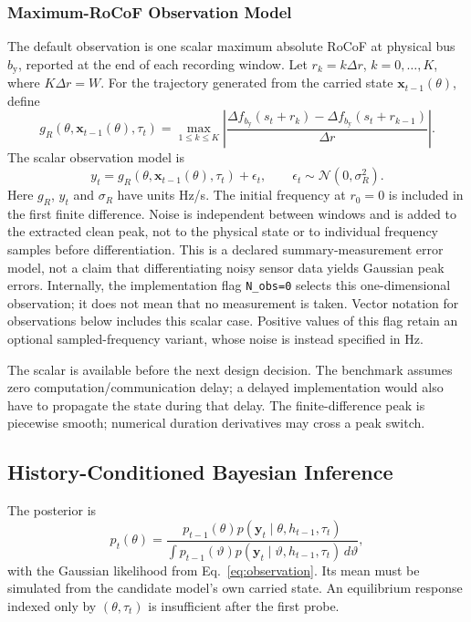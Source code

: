 \documentclass[journal]{IEEEtran}
\begin{document}
\subsubsection{Maximum-RoCoF Observation Model}
The default observation is one scalar maximum absolute RoCoF at physical
bus $b_{\mathrm y}$, reported at the end of each recording window. Let
$r_k=k\Delta r$, $k=0,\ldots,K$, where $K\Delta r=W$. For the trajectory
generated from the carried state $\mathbf x_{t-1}(\theta)$, define
\begin{equation}
g_R(\theta,\mathbf x_{t-1}(\theta),\tau_t)
=\max_{1\le k\le K}\left|
\frac{\Delta f_{b_{\mathrm y}}(s_t+r_k)-\Delta f_{b_{\mathrm y}}(s_t+r_{k-1})}
{\Delta r}\right|.
\label{eq:rocof-observation-functional}
\end{equation}
The scalar observation model is
\begin{equation}
y_t=g_R(\theta,\mathbf x_{t-1}(\theta),\tau_t)+\epsilon_t,
\qquad \epsilon_t\sim\mathcal N(0,\sigma_R^2).
\label{eq:observation}
\end{equation}
Here $g_R$, $y_t$ and $\sigma_R$ have units Hz/s. The initial frequency
at $r_0=0$ is included in the first finite difference. Noise is independent
between windows and is added to the extracted clean peak, not to the physical
state or to individual frequency samples before differentiation. This is a
declared summary-measurement error model, not a claim that differentiating
noisy sensor data yields Gaussian peak errors. Internally, the implementation
flag \texttt{N\_obs=0} selects this one-dimensional observation; it does not
mean that no measurement is taken. Vector notation for observations below
includes this scalar case. Positive values of this flag retain an optional
sampled-frequency variant, whose noise is instead specified in Hz.

The scalar is available before the next design decision. The benchmark assumes
zero computation/communication delay; a delayed implementation would also
have to propagate the state during that delay. The finite-difference peak
is piecewise smooth; numerical duration derivatives may cross a peak switch.

\subsection{History-Conditioned Bayesian Inference}
The posterior is
\begin{equation}
p_t(\theta)=
\frac{p_{t-1}(\theta)
 p(\mathbf y_t\mid\theta,h_{t-1},\tau_t)}
{\int p_{t-1}(\vartheta)
 p(\mathbf y_t\mid\vartheta,h_{t-1},\tau_t)\,d\vartheta},
\label{eq:posterior}
\end{equation}
with the Gaussian likelihood from Eq.~\eqref{eq:observation}. Its mean must
be simulated from the candidate model's own carried state. An equilibrium
response indexed only by $(\theta,\tau_t)$ is insufficient after the first probe.
\end{document}
